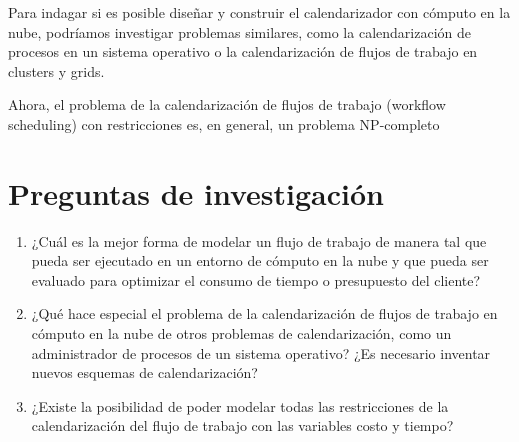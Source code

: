 \documentclass{article}
\begin{document}
Para indagar si es posible diseñar y construir el calendarizador con cómputo en la nube, podríamos investigar problemas similares, como la calendarización de procesos en un sistema operativo o la calendarización de flujos de trabajo en clusters y grids.

Ahora, el problema de la calendarización de flujos de trabajo (workflow scheduling) con restricciones es, en general, un problema NP-completo

\section*{Preguntas de investigación}
\begin{enumerate}
\item ¿Cuál es la mejor forma de modelar un flujo de trabajo de manera tal que pueda ser ejecutado en un entorno de cómputo en la nube y que pueda ser evaluado para optimizar el consumo de tiempo o presupuesto del cliente?
\item ¿Qué hace especial el problema de la calendarización de flujos de trabajo en cómputo en la nube de otros problemas de calendarización, como un administrador de procesos de un sistema operativo? ¿Es necesario inventar nuevos esquemas de calendarización?
\item ¿Existe la posibilidad de poder modelar todas las restricciones de la calendarización del flujo de trabajo con las variables costo y tiempo?
\end{enumerate}




\end{document}
